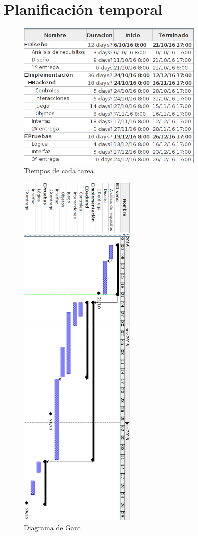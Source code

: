 \documentclass[palatino]{apuntes}
\begin{document}
\newpage
\appendix
\chapter{Planificación temporal}

\begin{figure}[hbtp]
    \centering
    \includegraphics[width=0.8\textwidth]{img/tabla_tiempos.png}
    \caption{Tiempos de cada tarea}
    \label{fig:tiempostarea}
\end{figure}

\newpage

\begin{figure}[hbtp]
    \centering
    \includegraphics[width=0.5\textwidth]{img/gant_completo.png}
    \caption{Diagrama de Gant}
    \label{fig:diagramagant}
\end{figure}
\end{document}
